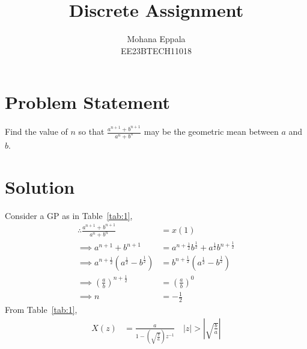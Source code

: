 \documentclass[12pt]{article}
\newcommand{\tabref}[1]{Table~\ref{#1}}
\providecommand{\abs}[1]{\left\vert#1\right\vert}
\begin{document}
\title{Discrete Assignment}
\author{Mohana Eppala\\ EE23BTECH11018}
\maketitle

\section*{Problem Statement}
Find the value of $n$ so that $\frac{a^{n+1} + b^{n+1}}{a^{n}+b^{n}}$ may be the geometric mean between $a$ and $b$.
\section*{Solution}
\fi

\begin{table}[H]

\end{table}

Consider a GP as in \tabref{tab:1},
\begin{align}
	\therefore \frac{a^{n+1} + b^{n+1}}{a^{n}+b^{n}} &= x(1) \\
	\implies a^{n+1} + b^{n+1} &= a^{n+\frac{1}{2}}b^{\frac{1}{2}} + a^{\frac{1}{2}}b^{n+\frac{1}{2}} \\
\implies a^{n+\frac{1}{2}}(a^{\frac{1}{2}} - b^{\frac{1}{2}}) &= b^{n+\frac{1}{2}}(a^{\frac{1}{2}} - b^{\frac{1}{2}}) \\
\implies (\frac{a}{b})^{n+\frac{1}{2}} &= (\frac{a}{b})^{0} \\
\implies n &= -\frac{1}{2}
\end{align}
From \tabref{tab:1},
\begin{align}
	X(z) &= \frac{a}{1-(\sqrt{\frac{b}{a}})z^{-1}} \quad \abs{z}>\abs{\sqrt{\frac{b}{a}}}
\end{align}
\end{document}
